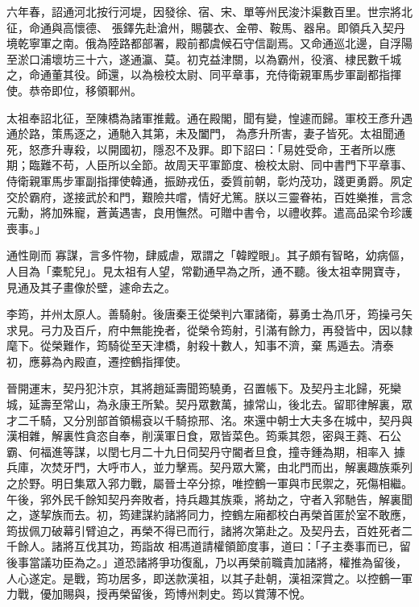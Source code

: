 \begin{pinyinscope}
 六年春，詔通河北按行河堤，因發徐、宿、宋、單等州民浚汴渠數百里。世宗將北征，命通與高懷德、
 張鐸先赴滄州，賜襲衣、金帶、鞍馬、器帛。即領兵入契丹境乾寧軍之南。俄為陸路都部署，殿前都虞候石守信副焉。又命通巡北邊，自浮陽至淤口浦壞坊三十六，遂通瀛、莫。初克益津關，以為霸州，役濱、棣民數千城之，命通董其役。師還，以為檢校太尉、同平章事，充侍衛親軍馬步軍副都指揮使。恭帝即位，移領鄆州。



 太祖奉詔北征，至陳橋為諸軍推戴。通在殿閣，聞有變，惶遽而歸。軍校王彥升遇通於路，策馬逐之，通馳入其第，未及闔門，
 為彥升所害，妻子皆死。太祖聞通死，怒彥升專殺，以開國初，隱忍不及罪。即下詔曰：「易姓受命，王者所以應期；臨難不苟，人臣所以全節。故周天平軍節度、檢校太尉、同中書門下平章事、侍衛親軍馬步軍副指揮使韓通，振跡戎伍，委質前朝，彰灼茂功，踐更勇爵。夙定交於霸府，遂接武於和門，艱險共嚐，情好尤篤。朕以三靈眷祐，百姓樂推，言念元勳，將加殊寵，蒼黃遇害，良用憮然。可贈中書令，以禮收葬。遣高品梁令珍護喪事。」



 通性剛而
 寡謀，言多忤物，肆威虐，眾謂之「韓瞠眼」。其子頗有智略，幼病傴，人目為「橐駝兒」。見太祖有人望，常勸通早為之所，通不聽。後太祖幸開寶寺，見通及其子畫像於壁，遽命去之。



 李筠，并州太原人。善騎射。後唐秦王從榮判六軍諸衛，募勇士為爪牙，筠操弓矢求見。弓力及百斤，府中無能挽者，從榮令筠射，引滿有餘力，再發皆中，因以隸麾下。從榮難作，筠騎從至天津橋，射殺十數人，知事不濟，棄
 馬遁去。清泰初，應募為內殿直，遷控鶴指揮使。



 晉開運末，契丹犯汴京，其將趙延壽聞筠驍勇，召置帳下。及契丹主北歸，死欒城，延壽至常山，為永康王所縶。契丹眾數萬，據常山，後北去。留耶律解裏，眾才二千騎，又分別部首領楊袞以千騎掠邢、洺。來還中朝士大夫多在城中，契丹與漢相雜，解裏性貪恣自奉，削漢軍日食，眾皆菜色。筠乘其怨，密與王蕘、石公霸、何福進等謀，以閏七月二十九日伺契丹守閽者旦食，撞寺鍾為期，相率入
 據兵庫，次焚牙門，大呼市人，並力擊焉。契丹眾大驚，由北門而出，解裏趣族乘列之於野。明日集眾入郛力戰，屬晉士卒分掠，唯控鶴一軍與市民禦之，死傷相繼。午後，郛外民千餘知契丹奔敗者，持兵趣其族乘，將劫之，守者入郛馳告，解裏聞之，遂挈族而去。初，筠建謀約諸將同力，控鶴左廂都校白再榮首匿於室不敢應，筠拔佩刀破幕引臂迫之，再榮不得已而行，諸將次第赴之。及契丹去，百姓死者二千餘人。諸將互伐其功，筠詣故
 相馮道請權領節度事，道曰：「子主奏事而已，留後事當議功臣為之。」道恐諸將爭功復亂，乃以再榮前職貴加諸將，權推為留後，人心遂定。是戰，筠功居多，即送款漢祖，以其子赴朝，漢祖深賞之。以控鶴一軍力戰，優加賜與，授再榮留後，筠博州刺史。筠以賞薄不悅。




\end{pinyinscope}
